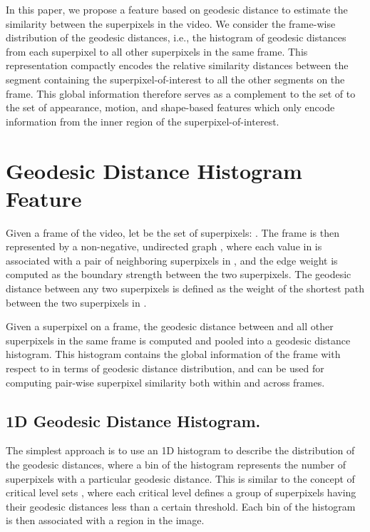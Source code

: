 \documentclass[runningheads]{llncs}
\begin{document}
In this paper, we propose a feature based on geodesic distance to estimate the similarity between the superpixels in the video. We consider the frame-wise distribution of the geodesic distances, i.e., the histogram of geodesic distances from each superpixel to all other superpixels in the same frame. This representation compactly encodes the relative similarity distances between the segment containing the superpixel-of-interest to all the  other segments on the frame. This global information therefore serves as a complement to the set of to the set of appearance, motion, and shape-based features which only encode information from the inner region of the superpixel-of-interest.















\section{Geodesic Distance Histogram Feature}
\label{sec:ft}
Given a frame of the video, let  be the set of superpixels: . 
The frame is then represented by a non-negative, undirected graph , where each value in  is associated with a pair of neighboring superpixels in , and the edge weight is computed as the boundary strength between the two superpixels. The geodesic distance between any two superpixels   is defined as the weight of the shortest path between the two superpixels in .

Given a superpixel  on a frame, the geodesic distance between  and all other superpixels in the same frame is computed and pooled into a geodesic distance histogram. This histogram contains the global information of the frame with respect to  in terms of geodesic distance distribution, and can be used for computing pair-wise superpixel similarity both within and across frames. 








\label{sec:HF}
\subsection{1D Geodesic Distance Histogram.}
The simplest approach is to use an 1D histogram to describe the distribution of the geodesic distances, where a bin of the histogram represents the number of superpixels with a particular geodesic distance. This is similar to the concept of critical level sets \cite{Krähenbühl2014}, where each critical level defines a group of superpixels having their geodesic distances less than a certain threshold. Each bin of the histogram is then associated with a region in the image.
\end{document}
